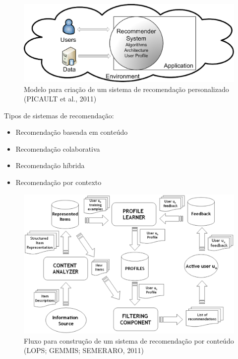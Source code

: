 \begin{frame}

\begin{figure}[h!]
  \centering
    \includegraphics[width=1\textwidth]{figura/recommender_model.eps}
  \caption{Modelo para criação de um sistema de recomendação personalizado (PICAULT et al., 2011)}
\end{figure}

\end{frame}

\begin{frame}
    Tipos de sistemas de recomendação:

    \begin{itemize}
        \item Recomendação baseada em conteúdo
        \item Recomendação colaborativa
        \item Recomendação híbrida
        \item Recomendação por contexto
    \end{itemize}
\end{frame}

\begin{frame}

\begin{figure}[h!]
  \centering
    \includegraphics[width=1\textwidth]{figura/recomendacao_conteudo.eps}
  \caption{Fluxo para construção de um sistema de recomendação por conteúdo (LOPS; GEMMIS; SEMERARO, 2011)}
\end{figure}

\end{frame}

